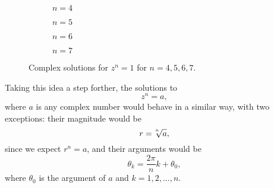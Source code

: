 \begin{figure}
	\captionsetup[subfigure]{labelformat=empty}
	\centering
	\begin{subfigure}[b]{0.475\textwidth}
		\centering
		\caption{$n=4$}
	\end{subfigure}
	\hfill
	\begin{subfigure}[b]{0.475\textwidth}
		\centering
		\caption{$n=5$}
	\end{subfigure}

	\begin{subfigure}[b]{0.475\textwidth}
		\centering
		\caption{$n=6$}
	\end{subfigure}
	\hfill
	\begin{subfigure}[b]{0.475\textwidth}
		\centering
		\caption{$n=7$}
	\end{subfigure}
	\caption{Complex solutions for $z^{n}=1$ for $n=4,5,6,7$.}
\end{figure}

Taking this idea a step forther, the solutions to
\begin{equation}
	z^{n} = a,
	\label{eq:}
\end{equation}
where $a$ is any complex number would behave in a similar way, with two exceptions: their magnitude would be
\begin{equation}
	r = \nroot{n}{a},
	\label{eq:}
\end{equation}
since we expect $r^{n}=a$, and their arguments would be
\begin{equation}
	\theta_{k} = \frac{2\pi}{n}k+\theta_{0},
	\label{eq:}
\end{equation}
where $\theta_{0}$ is the argument of $a$ and $k=1,2,\dots,n$.
